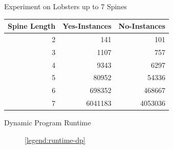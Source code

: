 \documentclass[aspectratio=169,notes]{beamer}
\begin{document}
\begin{frame}{Experiment on Lobsters up to 7 Spines}

\begin{table}
\centering
\begin{tabular}{ r|r|r }
\toprule
Spine Length & Yes-Instances & No-Instances \\
 \hline
2	 & 141	 	& 101 	\\
3	 & 1107	 	& 757 	\\
4	 & 9343	 	& 6297 	\\
5	 & 80952	& 54336  \\
6	 & 698352	& 468667  \\
7	 & 6041183	& 4053036  \\
\bottomrule
\end{tabular}
\end{table}

\end{frame}

\begin{frame}{Dynamic Program Runtime}

\begin{figure}
    \centering


    \scalebox{.8}{}
    \scalebox{.8}{}
    \ref{legend:runtime-dp}
\end{figure}

\end{frame}
\end{document}
